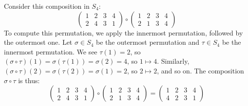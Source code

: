 \begin{example}
   Consider this composition in $S_4$:
   \[ \begin{pmatrix}
      1 & 2 & 3 & 4 \\
      2 & 4 & 3 & 1
      \end{pmatrix}
      \circ
      \begin{pmatrix}
      1 & 2 & 3 & 4 \\
      2 & 1 & 3 & 4
      \end{pmatrix}
   \]
   To compute this permutation, we apply the innermost permutation, followed by the outermost one. Let $\sigma \in S_4$ be the outermost permutation and $\tau \in S_4$ be the innermost permutation. We see $\tau(1) = 2$, so $(\sigma \circ \tau)(1) = \sigma(\tau(1)) = \sigma(2) = 4$, so $1 \mapsto 4$. Similarly, $(\sigma \circ \tau)(2) = \sigma(\tau(2)) = \sigma(1) = 2$, so $2 \mapsto 2$, and so on. The composition $\sigma \circ \tau$ is thus:
   \[ \begin{pmatrix}
      1 & 2 & 3 & 4 \\
      2 & 4 & 3 & 1
      \end{pmatrix}
      \circ
      \begin{pmatrix}
      1 & 2 & 3 & 4 \\
      2 & 1 & 3 & 4
      \end{pmatrix}
      =
      \begin{pmatrix}
      1 & 2 & 3 & 4 \\
      4 & 2 & 3 & 1
      \end{pmatrix}
   \]
\end{example}

